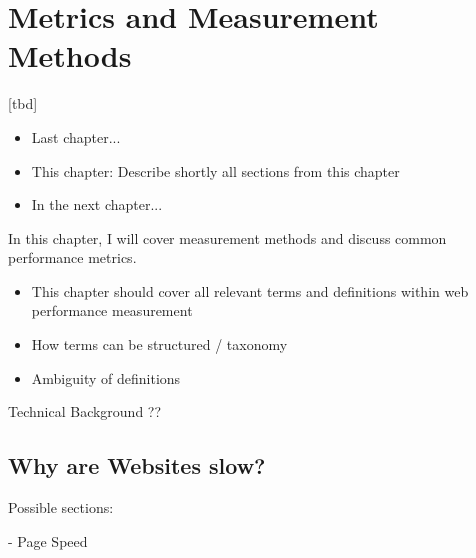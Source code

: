 \chapter{Metrics and Measurement Methods}

[tbd]

\begin{itemize}
	\item Last chapter...
	\item This chapter: Describe shortly all sections from this chapter
	\item In the next chapter...
\end{itemize}


In this chapter, I will cover measurement methods and discuss common performance metrics.

\begin{itemize}
\item This chapter should cover all relevant terms and definitions within web performance measurement
\item How terms can be structured / taxonomy
\item Ambiguity of definitions
\end{itemize}







Technical Background ??
\section{Why are Websites slow?}







Possible sections:

- Page Speed

